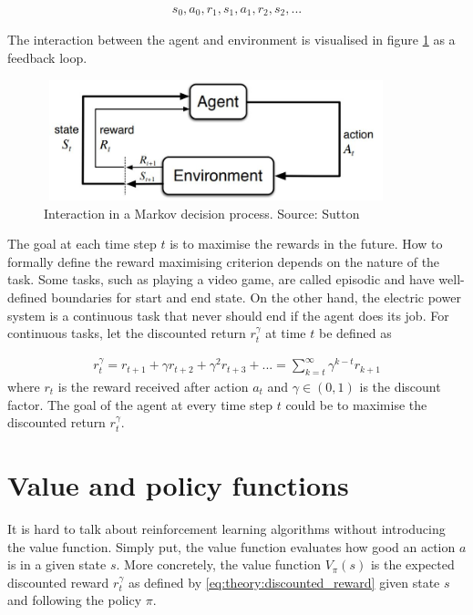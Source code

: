 \documentclass[class=book, crop=false]{standalone}
\begin{document}
\begin{equation}
   \begin{aligned}\label{eq:theory:trajectory}
s_{0},a_{0},r_{1},s_{1}, a_{1},r_{2},s_{2},...
\end{aligned} 
\end{equation}

The interaction between the agent and environment is visualised in figure \ref{fig:theory:markov_decision_process} as a feedback loop.

\begin{figure}[ht!]
    \center
    \includegraphics[height=3.5cm, width=10cm]{figures/markov_decision_processs.JPG}
    \caption[size = 9]{Interaction in a Markov decision process. Source: Sutton \cite{Sutton1998}}
    \label{fig:theory:markov_decision_process}
\end{figure}



The goal at each time step $t$ is to maximise the rewards in the future. How to formally define the reward maximising criterion depends on the nature of the task. Some tasks, such as playing a video game, are called episodic and have well-defined boundaries for start and end state. On the other hand, the electric power system is a continuous task that never should end if the agent does its job. For continuous tasks, let the discounted return $r^{\gamma}_{t}$ at time $t$ be defined as 


\begin{equation}
   \begin{aligned}\label{eq:theory:discounted_reward}
r^{\gamma}_{t} = r_{t+1} + \gamma r_{t+2} + \gamma^{2} r_{t+3} + ...
= \sum_{k=t}^{\infty} \gamma^{k-t}r_{k+1}
\end{aligned} 
\end{equation}
where $r_{t}$ is the reward received after action $a_{t}$ and $\gamma \in (0,1)$ is the discount factor. The goal of the agent at every time step $t$ could be to maximise the discounted return $r^{\gamma}_{t}$.



\section{Value and policy functions}
It is hard to talk about reinforcement learning algorithms without introducing the value function. Simply put, the value function evaluates how good an action $a$ is in a given state $s$. More concretely, the value function $V_{\pi}(s)$ is the expected discounted reward $r^{\gamma}_{t}$ as defined by \eqref{eq:theory:discounted_reward} given state $s$ and following the policy $\pi$.
\end{document}
